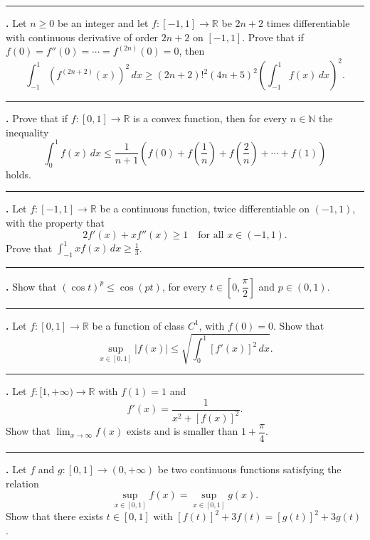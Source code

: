 \documentclass[11pt]{article}
\newcounter{probnum}
\newenvironment{problembox}{\par\noindent\rule{\linewidth}{0.5pt}\vspace{5pt}\par}{\vspace{2pt}}
\begin{document}
\begin{problembox}
\textbf{\theprobnum.} Let $n \ge 0$ be an integer and let $f : [-1,1] \to \mathbb{R}$ be $2n+2$ times differentiable with continuous derivative of order $2n+2$ on $[-1,1]$. Prove that if $f(0)=f''(0)=\cdots=f^{(2n)}(0)=0$, then
\[
\int_{-1}^{1} \left(f^{(2n+2)}(x)\right)^2\,dx \ge (2n+2)!^2 (4n+5)^2 \left(\int_{-1}^{1} f(x)\,dx\right)^2.
\]
\end{problembox}

\begin{problembox}
\textbf{\theprobnum.} Prove that if $f : [0,1] \to \mathbb{R}$ is a convex function, then for every $n \in \mathbb{N}$ the inequality
\[
\int_0^1 f(x)\,dx \le \frac{1}{n+1}\left(f(0) + f\left(\frac{1}{n}\right) + f\left(\frac{2}{n}\right) + \cdots + f(1)\right)
\]
holds.
\end{problembox}

\begin{problembox}
\textbf{\theprobnum.} Let $f : [-1,1] \to \mathbb{R}$ be a continuous function, twice differentiable on $(-1,1)$, with the property that
\[
2 f'(x) + x f''(x) \ge 1 \quad \text{for all } x \in (-1,1).
\]
Prove that $\displaystyle\int_{-1}^{1} x f(x)\,dx \ge \frac{1}{3}$.
\end{problembox}

\begin{problembox}
\textbf{\theprobnum.} Show that $(\cos t)^p \le \cos(pt)$, for every $t \in \left[0, \dfrac{\pi}{2}\right]$ and $p \in (0,1)$.
\end{problembox}

\begin{problembox}
\textbf{\theprobnum.} Let $f : [0,1] \to \mathbb{R}$ be a function of class $C^1$, with $f(0)=0$. Show that
\[
\sup_{x \in [0,1]} |f(x)| \le \sqrt{\int_0^1 [f'(x)]^2\,dx}.
\]
\end{problembox}

\begin{problembox}
\textbf{\theprobnum.} Let $f : [1,+\infty) \to \mathbb{R}$ with $f(1)=1$ and
\[
f'(x) = \frac{1}{x^2 + [f(x)]^2}.
\]
Show that $\displaystyle\lim_{x \to \infty} f(x)$ exists and is smaller than $1 + \dfrac{\pi}{4}$.
\end{problembox}

\begin{problembox}
\textbf{\theprobnum.} Let $f$ and $g : [0,1] \to (0,+\infty)$ be two continuous functions satisfying the relation
\[
\sup_{x \in [0,1]} f(x) = \sup_{x \in [0,1]} g(x).
\]
Show that there exists $t \in [0,1]$ with $[f(t)]^2 + 3f(t) = [g(t)]^2 + 3g(t)$.
\end{problembox}
\end{document}
